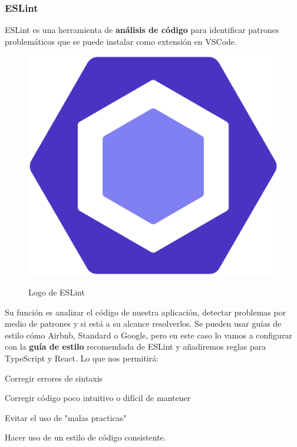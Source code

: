 \documentclass[12pt,twoside,titlepage]{report}
\begin{document}
\subsubsection{ESLint}

ESLint es una herramienta de \textbf{análisis de código} para identificar patrones problemáticos que se puede instalar como extensión en VSCode.

\begin{figure}[H]
    \centering
    \includegraphics[scale=0.05]{VSCode/ESLint}
    \label{fig:ESLintLogo}
    \caption{Logo de ESLint}
\end{figure}

Su función es analizar el código de nuestra aplicación, detectar problemas por medio de patrones y si está a su alcance resolverlos. Se pueden usar guías de estilo cómo Airbnb, Standard o Google, pero en este caso lo vamos a configurar con la \textbf{guía de estilo} recomendada de ESLint y añadiremos reglas para TypeScript y React. Lo que nos permitirá:

\begin{compactitem}
 \item Corregir errores de sintaxis
 \item Corregir código poco intuitivo o difícil de mantener
 \item Evitar el uso de "malas practicas"
 \item Hacer uso de un estilo de código consistente.
\end{compactitem}
\end{document}
